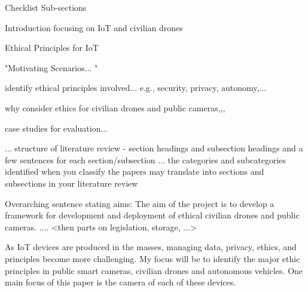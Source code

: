Checklist 
Sub-sections

Introduction focusing on IoT and civilian drones



Ethical Principles for IoT

"Motivating Scenarios...  "

identify ethical principles involved... e.g., security, privacy, autonomy,...


why consider ethics for civilian drones and public cameras,,,

case studies for evaluation...


 ... structure of literature review - section headings and subsection headings and a few sentences for each section/subsection ... the categories and subcategories identified when you classify the papers may translate into sections and subsections in your literature review

Overarching sentence stating aims: The aim of the project is to develop a framework for development and deployment of ethical civilian drones and public cameras. .... <then parts on legislation, storage, ...>


As IoT devices are produced in the masses, managing data, privacy, ethics, and principles become more challenging. My focus will be to identify the major ethic principles in public smart cameras, civilian drones and autonomous vehicles. One main focus of this paper is the camera of each of these devices. 
